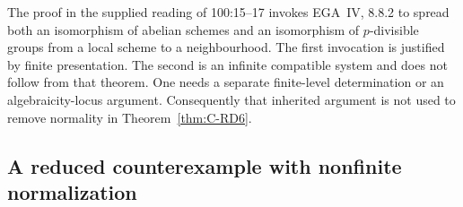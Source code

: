 \begin{remark}
The proof in the supplied reading of 100:15--17 invokes EGA~IV, 8.8.2
to spread both an isomorphism of abelian schemes and an isomorphism of
$p$-divisible groups from a local scheme to a neighbourhood. The first
invocation is justified by finite presentation. The second is an
infinite compatible system and does not follow from that theorem.
One needs a separate finite-level determination or an algebraicity-locus
argument. Consequently that inherited argument is not used to remove
normality in Theorem~\ref{thm:C-RD6}.
\end{remark}

\subsection{A reduced counterexample with nonfinite normalization}

